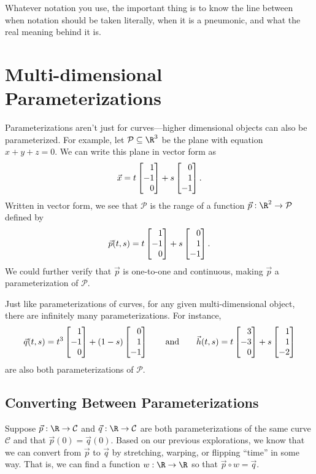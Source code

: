Whatever notation you use, the important thing is to know the line between
when notation should be taken literally, when it is a pneumonic, and what the
real meaning behind it is.


\section{Multi-dimensional Parameterizations}

Parameterizations aren't just for curves---higher dimensional objects can also be parameterized.
For example, let $\mathcal P\subseteq \R^3$ be the plane with equation $x+y+z=0$.  We can write this plane
in vector form as 
\[
	\vec x = t\mat{1\\-1\\0} + s\mat{0\\1\\-1}.	
\]
Written in vector form, we see that $\mathcal P$ is the range of a function $\vec p:\R^2\to\mathcal P$
defined by 
\[
	\vec p(t,s) = t\mat{1\\-1\\0} + s\mat{0\\1\\-1}.
\]
We could further verify that $\vec p$ is one-to-one and continuous,  
making $\vec p$ a parameterization
of $\mathcal P$.

Just like parameterizations of curves, for any given multi-dimensional object, there are
infinitely many parameterizations.  For instance,
\[
	\vec q(t,s) = t^3\mat{1\\-1\\0} + (1-s)\mat{0\\1\\-1}\qquad\text{and}\qquad
	\vec h(t,s) = t\mat{3\\-3\\0} + s\mat{1\\1\\-2}
\]
are also both parameterizations of $\mathcal P$.

\subsection{Converting Between Parameterizations}
Suppose $\vec p:\R\to\mathcal C$ and $\vec q:\R\to\mathcal C$ are both parameterizations of
the same curve $\mathcal C$ and that $\vec p(0)=\vec q(0)$.  Based on our previous explorations,
we know that we can convert from $\vec p$ to $\vec q$ by stretching, warping, or flipping ``time''
in some way.  That is, we can find a function $w:\R\to\R$ so that $\vec p\circ w=\vec q$.

